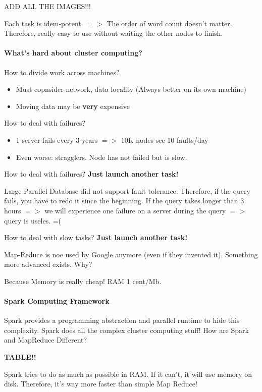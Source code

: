 ADD ALL THE IMAGES!!! 

Each task is idem-potent. $=>$ The order of word count doesn't matter. Therefore, really easy to use without waiting the other nodes to finish.

\paragraph{What's hard about cluster computing?}

How to divide work across machines?
\begin{itemize}
 \item Must copnsider network, data locality (Always better on its own machine)
 \item Moving data may be {\bf very} expensive
\end{itemize}

How to deal with failures?
\begin{itemize}
 \item 1 server fails every 3 years $=>$ 10K nodes see 10 faults/day
 \item Even worse: stragglers. Node has not failed but is slow.
\end{itemize}

How to deal with failures? {\bf Just launch another task!}

Large Parallel Database did not support fault tolerance. Therefore, if the query fails, you have to redo it since the beginning. If the query takes longer than 3 hours $=>$ we will experience one failure on a server during the query $=>$ query is useles. =(

How to deal with slow tasks? {\bf Just launch another task!}

Map-Reduce is noe used by Google anymore (even if they invented it). Something more advanced exists. Why? 

Because Memory is really cheap! RAM 1 cent/Mb. 

\paragraph{Spark Computing Framework}

Spark provides a programming abstraction and parallel runtime to hide this complexity. Spark does all the complex cluster computing stuff! How are Spark and MapReduce Different?

{\bf TABLE!!}

Spark tries to do as much as possible in RAM. If it can't, it will use memory on disk. Therefore, it's way more faster than simple Map Reduce! 

